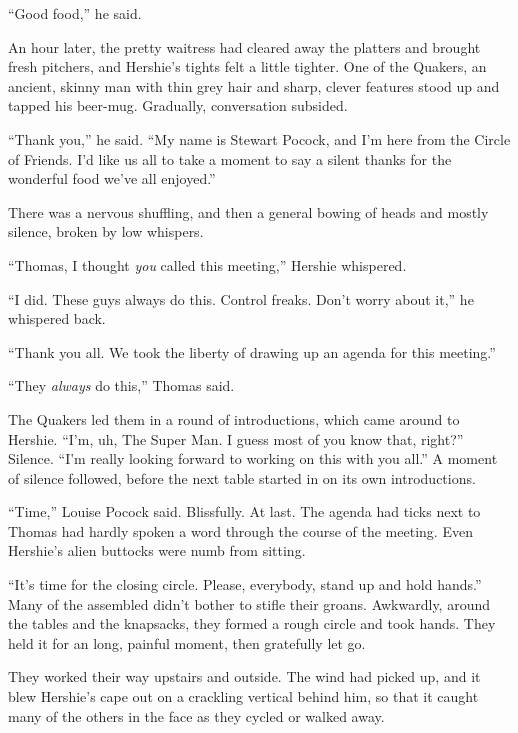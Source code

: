 ``Good food,'' he said.

\tb

An hour later, the pretty waitress had cleared away the platters
and brought fresh pitchers, and Hershie's tights felt a little
tighter. One of the Quakers, an ancient, skinny man with thin grey
hair and sharp, clever features stood up and tapped his beer-mug.
Gradually, conversation subsided.

``Thank you,'' he said.
``My name is Stewart Pocock, and I'm here from the Circle of Friends. I'd like 
us all to take a moment to say a silent thanks for the wonderful food we've all 
enjoyed.''

There was a nervous shuffling, and then a general bowing of heads
and mostly silence, broken by low whispers.

``Thomas, I thought \emph{you} called this meeting,'' Hershie
whispered.

``I did. These guys always do this. Control freaks. Don't worry about it,''
he whispered back.

``Thank you all. We took the liberty of drawing up an agenda for this meeting.''

``They \emph{always} do this,'' Thomas said.

The Quakers led them in a round of introductions, which came around
to Hershie.
``I'm, uh, The Super Man. I guess most of you know that, right?''
Silence.
``I'm really looking forward to working on this with you all.'' A
moment of silence followed, before the next table started in on its
own introductions.

\tb

``Time,'' Louise Pocock said. Blissfully. At last. The agenda had
ticks next to  Thomas had hardly spoken a word
through the course of the meeting. Even Hershie's alien buttocks
were numb from sitting.

``It's time for the closing circle. Please, everybody, stand up and hold 
hands.''
Many of the assembled didn't bother to stifle their groans.
Awkwardly, around the tables and the knapsacks, they formed a rough
circle and took hands. They held it for an long, painful moment,
then gratefully let go.

They worked their way upstairs and outside. The wind had picked up,
and it blew Hershie's cape out on a crackling vertical behind him,
so that it caught many of the others in the face as they cycled or
walked away.

